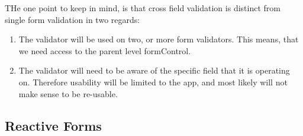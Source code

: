 THe one point to keep in mind, is that cross field validation is distinct 
from single form validation in two regards: 
\begin{enumerate}
  \item The validator will be used on two, or more form validators. This 
  means, that we need access to the parent level formControl.
  \item The validator will need to be aware of the specific field that it is
  operating on. Therefore usability will be limited to the app, and most likely
  will not make sense to be re-usable. 
\end{enumerate}


\subsection{Reactive Forms}

